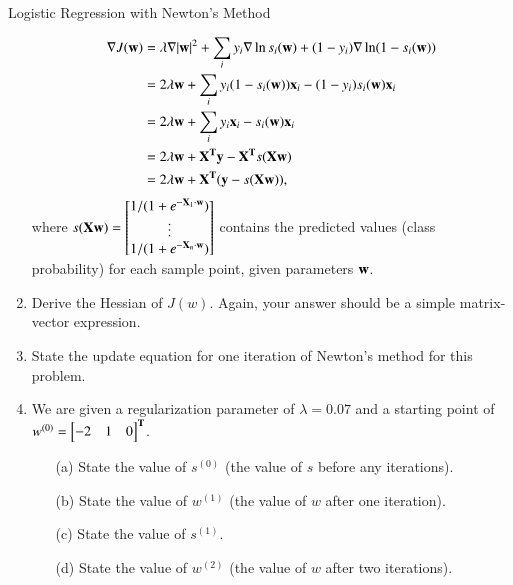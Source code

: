 \documentclass[section]{problemset}
\begin{document}
\begin{problem}{Logistic Regression with Newton's Method}
\begin{enumerate}
\begin{mdframed}
\begin{align*}
  \nabla J(\mathbf w)
  &= \lambda \nabla |\mathbf w|^2 + \sum_i
  y_i     \nabla \ln s_i(\mathbf w) +
  (1-y_i) \nabla \ln(1 - s_i(\mathbf w)) \\
  &= 2\lambda\mathbf w + \sum_i y_i (1 - s_i(\mathbf w))\mathbf x_i - (1 - y_i) s_i(\mathbf w)\mathbf x_i \\
  &= 2\lambda\mathbf w + \sum_i y_i\mathbf x_i - s_i(\mathbf w)\mathbf x_i \\
  &= 2\lambda\mathbf w + \mathbf X^{\mathbf{T}}\mathbf y - \mathbf X^{\mathbf{T}} s(\mathbf X\mathbf w) \\
  &= 2\lambda\mathbf w + \mathbf X^{\mathbf{T}}(\mathbf y - s(\mathbf X\mathbf w)),
\end{align*}
where
$s(\mathbf X\mathbf w) = \begin{bmatrix}1/(1+e^{-\mathbf X_1\cdot\mathbf w})\\\vdots\\1/(1+e^{-\mathbf X_n\cdot\mathbf w})\end{bmatrix}$
contains the predicted values (class probability) for each sample point, given
parameters $\mathbf w$.
\end{mdframed}


\item
Derive the Hessian of $J(w)$.
Again, your answer should be a simple matrix-vector expression.


\item State the update equation for one iteration of Newton's method for this problem.



\item
We are given a regularization parameter of $\lambda = 0.07$ and
a starting point of $w^{(0)} = \begin{bmatrix} -2 & 1 & 0 \end{bmatrix}^{\mathbf{T}}$.
\begin{itemize}
\item[(a)]
State the value of $s^{(0)}$ (the value of $s$ before any iterations).



\item[(b)]
State the value of $w^{(1)}$ (the value of $w$ after one iteration).


\item[(c)]
State the value of $s^{(1)}$.


\item[(d)]
State the value of $w^{(2)}$ (the value of $w$ after two iterations).

\end{itemize}
\end{enumerate}
\end{problem}




\end{document}
